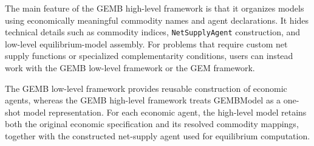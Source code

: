 \documentclass[
  letterpaper,
  DIV=11,
  numbers=noendperiod]{scrreprt}
\begin{document}
The main feature of the GEMB high-level framework is that it organizes
models using economically meaningful commodity names and agent
declarations. It hides technical details such as commodity indices,
\texttt{NetSupplyAgent} construction, and low-level equilibrium-model
assembly. For problems that require custom net supply functions or
specialized complementarity conditions, users can instead work with the
GEMB low-level framework or the GEM framework.

The GEMB low-level framework provides reusable construction of economic
agents, whereas the GEMB high-level framework treats GEMBModel as a
one-shot model representation. For each economic agent, the high-level
model retains both the original economic specification and its resolved
commodity mappings, together with the constructed net-supply agent used
for equilibrium computation.
\end{document}
